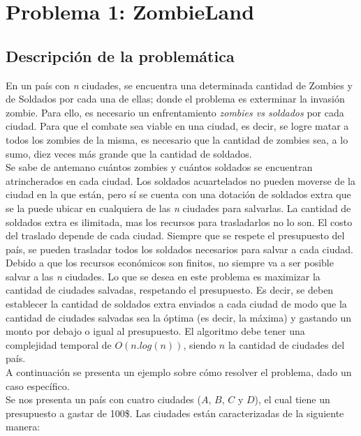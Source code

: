 \section{Problema 1: ZombieLand}

\subsection{Descripci\'on de la problem\'atica}

En un pa\'is con \emph{n} ciudades, se encuentra una determinada cantidad de Zombies y de Soldados por cada una de ellas; donde el problema es exterminar la invasi\'on zombie. Para ello, es necesario un enfrentamiento \textit{zombies vs soldados} por cada ciudad. Para que el combate sea viable en una ciudad, es decir, se logre matar a todos los zombies de la misma, es necesario que la cantidad de zombies sea, a lo sumo, diez veces m\'as grande que la cantidad de soldados.\\

Se sabe de antemano cu\'antos zombies y cu\'antos soldados se encuentran atrincherados en cada ciudad. Los soldados acuartelados no pueden moverse de la ciudad en la que est\'an, pero s\'i se cuenta con una dotaci\'on de soldados extra que se la puede ubicar en cualquiera de las \emph{n} ciudades para salvarlas. La cantidad de soldados extra es ilimitada, mas los recursos para trasladarlos no lo son. El costo del traslado depende de cada ciudad. Siempre que se respete el presupuesto del pa\'is, se pueden trasladar todos los soldados necesarios para salvar a cada ciudad.\\

Debido a que los recursos econ\'omicos son finitos, no siempre va a ser posible salvar a las \emph{n} ciudades. Lo que se desea en este problema es maximizar la cantidad de ciudades salvadas, respetando el presupuesto. Es decir, se deben establecer la cantidad de soldados extra enviados a cada ciudad de modo que la cantidad de ciudades salvadas sea la \'optima (es decir, la máxima) y gastando un monto por debajo o igual al presupuesto.  El algoritmo debe tener una complejidad temporal de $O(n.log(n))$, siendo $n$ la cantidad de ciudades del pa\'is.\\

A continuaci\'on se presenta un ejemplo sobre c\'omo resolver el problema, dado un caso espec\'ifico.\\

Se nos presenta un pa\'is con cuatro ciudades ($A$, $B$, $C$ y $D$), el cual tiene un presupuesto a gastar de 100\$. Las ciudades est\'an caracterizadas de la siguiente manera:


